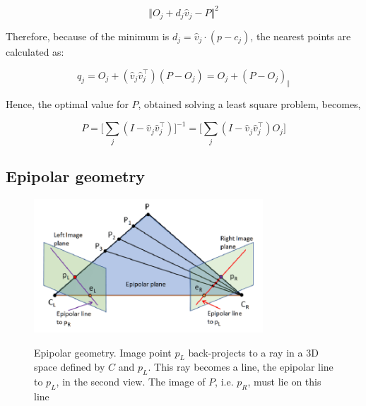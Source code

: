 \begin{equation}
\label{eqn:mindist}
	\Vert O_j + d_j \hat{v}_j - P \Vert^2
\end{equation}

Therefore, because of the minimum is $d_j = \hat{v}_j \cdot (p - c_j)$, the nearest points are calculated as:

\begin{equation}\label{eqn:closestpoint}
	q_j = O_j + (\hat{v}_j \hat{v}_j^\top)(P - O_j) = O_j + (P - O_j)_{\Vert}
\end{equation}

Hence, the optimal value for $P$, obtained solving a least square problem, becomes,

\begin{equation}\label{eqn:solP}
	P = \Big[ \sum_j (I - \hat{v}_j \hat{v}_j^\top ) \Big]^{-1} = \Big[ \sum_j (I - \hat{v}_j \hat{v}_j^\top )O_j \Big]
\end{equation}

\subsection{Epipolar geometry}
\label{subsection:epipolar-geometry}

\begin{figure}[t]
	\begin{center}
		{\includegraphics[width=.8\textwidth, height=5cm, keepaspectratio]{images/epipolar-geometry-2}}
\caption{Epipolar geometry. Image point $p_L$ back-projects to a ray in a 3D space defined by $C$ and $p_L$. This ray becomes a line, the epipolar line to $p_L$, in the second view. The image of $P$, i.e. $p_R$, must lie on this line}
\label{fig:epipolargeom-2}
	\end{center}
\end{figure}

